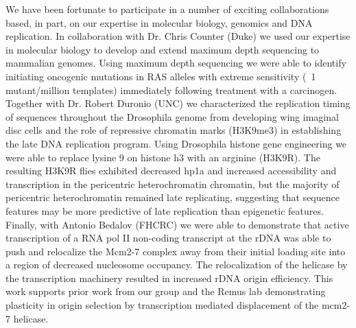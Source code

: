 We have been fortunate to participate in a number of exciting collaborations based, in part, on our expertise in molecular biology, genomics and DNA replication.  In collaboration with Dr. Chris Counter (Duke) we used our expertise in molecular biology to develop and extend maximum depth sequencing\cite{} to mammalian genomes.  Using maximum depth sequencing we were able to identify initiating oncogenic mutations in RAS alleles with extreme sensitivity (~1 mutant/million templates) immediately following treatment with a carcinogen\cite{}.  Together with Dr. Robert Duronio (UNC) we characterized the replication timing of sequences throughout the Drosophila genome from developing wing imaginal disc cells and the role of repressive chromatin marks (H3K9me3) in establishing the late DNA replication program\citep{}.  Using Drosophila histone gene engineering\citep{} we were able to replace lysine 9 on histone h3 with an arginine (H3K9R).  The resulting H3K9R flies exhibited decreased hp1a and increased accessibility and transcription in the pericentric heterochromatin chromatin, but the majority of pericentric heterochromatin remained late replicating, suggesting that sequence features may be more predictive of late replication than epigenetic features.  Finally, with Antonio Bedalov (FHCRC) we were able to demonstrate that active transcription of a RNA pol II non-coding transcript at the rDNA was able to push and relocalize the Mcm2-7 complex away from their initial loading site into a region of decreased nucleosome occupancy.  The relocalization of the helicase by the transcription machinery resulted in increased rDNA origin efficiency.  This work supports prior work from our group\citep{} and the Remus lab\citep{} demonstrating  plasticity in origin selection by transcription mediated displacement of the mcm2-7 helicase. 














